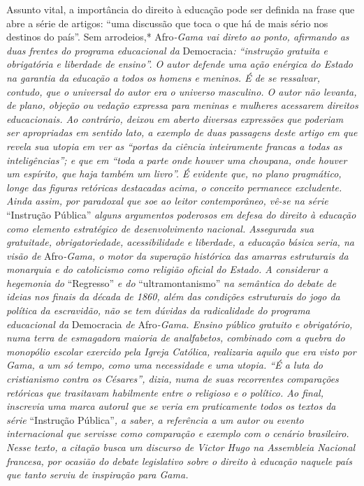 \begin{didascalia}
Assunto vital, a importância do direito à educação pode ser definida na
frase que abre a série de artigos: ``uma discussão que toca o que há de
mais sério nos destinos do país''. Sem arrodeios,* Afro\emph{-Gama vai
direto ao ponto, afirmando as duas frentes do programa educacional da}
Democracia\emph{: ``instrução gratuita e obrigatória e liberdade de
ensino''. O autor defende uma ação enérgica do Estado na garantia da
educação a todos os homens e meninos. É de se ressalvar, contudo, que o
universal do autor era o universo masculino. O autor não levanta, de
plano, objeção ou vedação expressa para meninas e mulheres acessarem
direitos educacionais. Ao contrário, deixou em aberto diversas
expressões que poderiam ser apropriadas em sentido lato, a exemplo de
duas passagens deste artigo em que revela sua utopia em ver as ``portas
da ciência inteiramente francas a todas as inteligências''; e que em
``toda a parte onde houver uma choupana, onde houver um espírito, que
haja também um livro''. É evidente que, no plano pragmático, longe das
figuras retóricas destacadas acima, o conceito permanece excludente.
Ainda assim, por paradoxal que soe ao leitor contemporâneo, vê-se na
série} ``Instrução Pública'' \emph{alguns argumentos poderosos em defesa
do direito à educação como elemento estratégico de desenvolvimento
nacional. Assegurada sua gratuitade, obrigatoriedade, acessibilidade e
liberdade, a educação básica seria, na visão de} Afro\emph{-Gama, o
motor da superação histórica das amarras estruturais da monarquia e do
catolicismo como religião oficial do Estado. A considerar a hegemonia
do} ``Regresso'' \emph{e do} ``ultramontanismo'' \emph{na semântica do
debate de ideias nos finais da década de 1860, além das condições
estruturais do jogo da política da escravidão, não se tem dúvidas da
radicalidade do programa educacional da} Democracia \emph{de}
Afro\emph{-Gama. Ensino público gratuito e obrigatório, numa terra de
esmagadora maioria de analfabetos, combinado com a quebra do monopólio
escolar exercido pela Igreja Católica, realizaria aquilo que era visto
por Gama, a um só tempo, como uma necessidade e uma utopia. ``É a luta do
cristianismo contra os Césares'', dizia, numa de suas recorrentes
comparações retóricas que trasitavam habilmente entre o religioso e o
político. Ao final, inscrevia uma marca autoral que se veria em
praticamente todos os textos da série} ``Instrução Pública''\emph{, a
saber, a referência a um autor ou evento internacional que servisse como
comparação e exemplo com o cenário brasileiro. Nesse texto, a citação
busca um discurso de Victor Hugo na Assembleia Nacional francesa, por
ocasião do debate legislativo sobre o direito à educação naquele país
que tanto serviu de inspiração para Gama.}
\end{didascalia}

